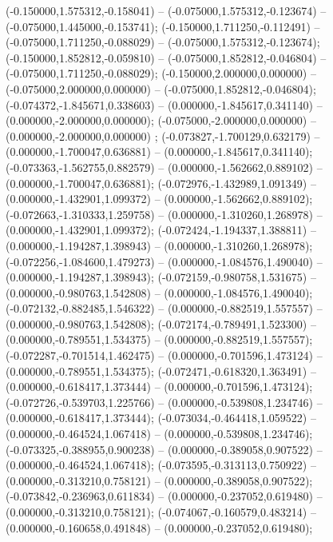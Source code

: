 (-0.150000,1.575312,-0.158041) -- (-0.075000,1.575312,-0.123674) -- (-0.075000,1.445000,-0.153741);
 (-0.150000,1.711250,-0.112491) -- (-0.075000,1.711250,-0.088029) -- (-0.075000,1.575312,-0.123674);
 (-0.150000,1.852812,-0.059810) -- (-0.075000,1.852812,-0.046804) -- (-0.075000,1.711250,-0.088029);
 (-0.150000,2.000000,0.000000) -- (-0.075000,2.000000,0.000000) -- (-0.075000,1.852812,-0.046804);
 (-0.074372,-1.845671,0.338603) -- (0.000000,-1.845617,0.341140) -- (0.000000,-2.000000,0.000000);
 (-0.075000,-2.000000,0.000000) -- (0.000000,-2.000000,0.000000) ;
 (-0.073827,-1.700129,0.632179) -- (0.000000,-1.700047,0.636881) -- (0.000000,-1.845617,0.341140);
 (-0.073363,-1.562755,0.882579) -- (0.000000,-1.562662,0.889102) -- (0.000000,-1.700047,0.636881);
 (-0.072976,-1.432989,1.091349) -- (0.000000,-1.432901,1.099372) -- (0.000000,-1.562662,0.889102);
 (-0.072663,-1.310333,1.259758) -- (0.000000,-1.310260,1.268978) -- (0.000000,-1.432901,1.099372);
 (-0.072424,-1.194337,1.388811) -- (0.000000,-1.194287,1.398943) -- (0.000000,-1.310260,1.268978);
 (-0.072256,-1.084600,1.479273) -- (0.000000,-1.084576,1.490040) -- (0.000000,-1.194287,1.398943);
 (-0.072159,-0.980758,1.531675) -- (0.000000,-0.980763,1.542808) -- (0.000000,-1.084576,1.490040);
 (-0.072132,-0.882485,1.546322) -- (0.000000,-0.882519,1.557557) -- (0.000000,-0.980763,1.542808);
 (-0.072174,-0.789491,1.523300) -- (0.000000,-0.789551,1.534375) -- (0.000000,-0.882519,1.557557);
 (-0.072287,-0.701514,1.462475) -- (0.000000,-0.701596,1.473124) -- (0.000000,-0.789551,1.534375);
 (-0.072471,-0.618320,1.363491) -- (0.000000,-0.618417,1.373444) -- (0.000000,-0.701596,1.473124);
 (-0.072726,-0.539703,1.225766) -- (0.000000,-0.539808,1.234746) -- (0.000000,-0.618417,1.373444);
 (-0.073034,-0.464418,1.059522) -- (0.000000,-0.464524,1.067418) -- (0.000000,-0.539808,1.234746);
 (-0.073325,-0.388955,0.900238) -- (0.000000,-0.389058,0.907522) -- (0.000000,-0.464524,1.067418);
 (-0.073595,-0.313113,0.750922) -- (0.000000,-0.313210,0.758121) -- (0.000000,-0.389058,0.907522);
 (-0.073842,-0.236963,0.611834) -- (0.000000,-0.237052,0.619480) -- (0.000000,-0.313210,0.758121);
 (-0.074067,-0.160579,0.483214) -- (0.000000,-0.160658,0.491848) -- (0.000000,-0.237052,0.619480);
